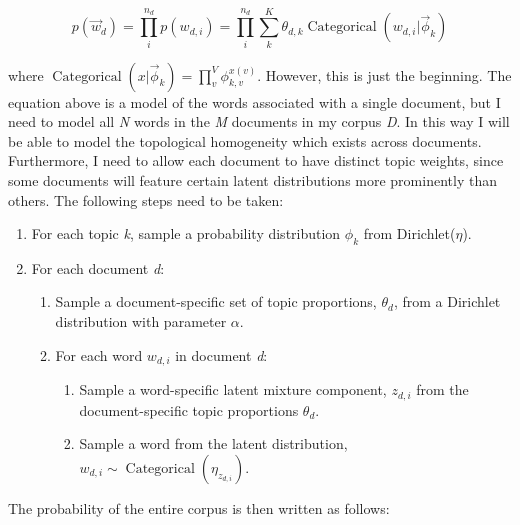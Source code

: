 \begin{equation}
p\left(\vec{w}_{d}\right)=\prod_{i}^{n_{d}} p\left(w_{d, i}\right)=\prod_{i}^{n_{d}} \sum_{k}^{K} \theta_{d, k} \operatorname{Categorical}\left(w_{d, i} | \vec{\phi}_{k}\right)
\end{equation}

\noindent where $\operatorname{Categorical}\left(x | \vec{\phi}_{k}\right)=\prod_{v}^{V} \phi_{k, v}^{x(v)}$. However, this is just the beginning. The equation above is a model of the words associated with a single document, but I need to model all \textit{N} words in the \textit{M} documents in my corpus \textit{D}. In this way I will be able to model the topological homogeneity which exists across documents. Furthermore, I need to allow each document to have distinct topic weights, since some documents will feature certain latent distributions more prominently than others. The following steps need to be taken:

\begin{enumerate}
	\item For each topic \textit{k}, sample a probability distribution $\phi_{k}$ from Dirichlet($\eta$).
	\item For each document \textit{d}:
	\begin{enumerate}
		\item Sample a document-specific set of topic proportions, $\theta_{d}$, from a Dirichlet distribution with parameter $\alpha$.
		\item For each word $w_{d,i}$ in document \textit{d}:
		\begin{enumerate}
		\item Sample a word-specific latent mixture component, $z_{d,i}$ from the document-specific topic proportions $\theta_{d}$.
		\item Sample a word from the latent distribution, $w_{d,i} \sim \operatorname{Categorical}(\eta_{z_{d,i}})$.
		\end{enumerate}
	\end{enumerate}
\end{enumerate}

\noindent The probability of the entire corpus is then written as follows:

